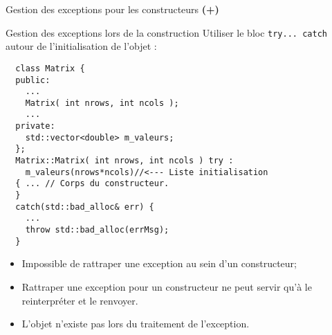 \documentclass[compress,10pt,aspectratio=169]{beamer}
\begin{document}
\begin{frame}[fragile]{Gestion des exceptions pour les constructeurs {\color{red}\bf\Large (+)}}
  \scriptsize
  \begin{block}{\small Gestion des exceptions lors de la construction}
    Utiliser le bloc \texttt{try... catch} autour de l'initialisation de l'objet :
  \begin{multicols}{2}
  \begin{minipage}{0.49\textwidth}
  \begin{verbatim}
  class Matrix { 
  public: 
    ...
    Matrix( int nrows, int ncols );
    ...
  private: 
    std::vector<double> m_valeurs; 
  };
  Matrix::Matrix( int nrows, int ncols ) try :
    m_valeurs(nrows*ncols)//<--- Liste initialisation
  { ... // Corps du constructeur.
  }
  catch(std::bad_alloc& err) {
    ...
    throw std::bad_alloc(errMsg);
  }
  \end{verbatim}
  \end{minipage}
  \begin{minipage}{0.49\textwidth}
    \begin{itemize}
    \item Impossible de rattraper une exception au sein d'un constructeur;
    \item Rattraper une exception pour un constructeur ne peut servir qu'à le reinterpréter et le renvoyer.
    \item L'objet n'existe pas lors du traitement de l'exception.
  \end{itemize}
  \end{minipage}
  \end{multicols}
  \end{block}
  \end{frame}
    
\end{document}

